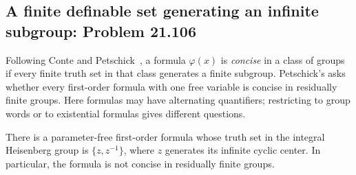 \subsection{A finite definable set generating an infinite subgroup: Problem 21.106}
\label{subsec:concise}

Following Conte and Petschick~\cite{contepetschick}, a formula
$\varphi(x)$ is \emph{concise} in a class of groups if every finite
truth set in that class generates a finite subgroup.
Petschick's  asks whether every first-order formula with
one free variable is concise in residually finite groups.
Here formulas may have alternating quantifiers; restricting to
group words or to existential formulas gives different questions.

\begin{theorem}
\label{thm:concise}
There is a parameter-free first-order formula whose truth set in
the integral Heisenberg group is $\{z,z^{-1}\}$, where $z$ generates
its infinite cyclic center. In particular, the formula is not
concise in residually finite groups.
\end{theorem}

